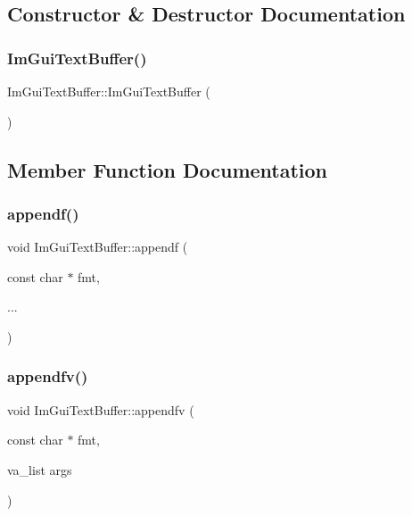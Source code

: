 \subsection{Constructor \& Destructor Documentation}
\hypertarget{struct_im_gui_text_buffer_a4c4369c5e65f591554428b947c498d0d}{}\label{struct_im_gui_text_buffer_a4c4369c5e65f591554428b947c498d0d} 
\subsubsection{\texorpdfstring{Im\+Gui\+Text\+Buffer()}{ImGuiTextBuffer()}}
{\footnotesize\ttfamily Im\+Gui\+Text\+Buffer\+::\+Im\+Gui\+Text\+Buffer (\begin{DoxyParamCaption}{ }\end{DoxyParamCaption})}



\subsection{Member Function Documentation}
\hypertarget{struct_im_gui_text_buffer_a1c5892db030c5364823793f472754c9e}{}\label{struct_im_gui_text_buffer_a1c5892db030c5364823793f472754c9e} 
\subsubsection{\texorpdfstring{appendf()}{appendf()}}
{\footnotesize\ttfamily void Im\+Gui\+Text\+Buffer\+::appendf (\begin{DoxyParamCaption}\item[{const char $\ast$}]{fmt,  }\item[{}]{... }\end{DoxyParamCaption})}

\hypertarget{struct_im_gui_text_buffer_ac8a6b11834c4cee8113bf6950e66112e}{}\label{struct_im_gui_text_buffer_ac8a6b11834c4cee8113bf6950e66112e} 
\subsubsection{\texorpdfstring{appendfv()}{appendfv()}}
{\footnotesize\ttfamily void Im\+Gui\+Text\+Buffer\+::appendfv (\begin{DoxyParamCaption}\item[{const char $\ast$}]{fmt,  }\item[{va\+\_\+list}]{args }\end{DoxyParamCaption})}

